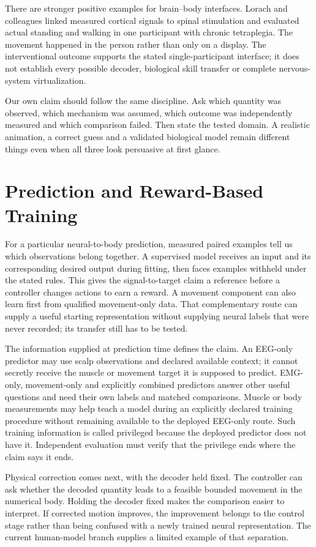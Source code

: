 There are stronger positive examples for brain--body interfaces. Lorach and
colleagues linked measured cortical signals to spinal stimulation and evaluated
actual standing and walking in one participant with chronic tetraplegia. The
movement happened in the person rather than only on a display.\cite{lorach2023}
The interventional outcome supports the stated single-participant interface;
it does not establish every possible decoder, biological skill transfer or
complete nervous-system virtualization.

Our own claim should follow the same discipline. Ask which quantity was observed,
which mechanism was assumed, which outcome was independently measured and which
comparison failed. Then state the tested domain. A realistic animation, a
correct guess and a validated biological model remain different things even
when all three look persuasive at first glance.


\section{Prediction and Reward-Based Training}

For a particular neural-to-body prediction, measured paired examples tell us which observations belong together. A supervised model receives an input and its corresponding desired output during fitting, then faces examples withheld under the stated rules. This gives the signal-to-target claim a reference before a controller changes actions to earn a reward. A movement component can also learn first from qualified movement-only data. That complementary route can supply a useful starting representation without supplying neural labels that were never recorded; its transfer still has to be tested.

The information supplied at prediction time defines the claim. An EEG-only
predictor may use scalp observations and declared available context; it cannot
secretly receive the muscle or movement target it is supposed to predict.
EMG-only, movement-only and explicitly combined predictors answer other useful
questions and need their own labels and matched comparisons. Muscle or body
measurements may help teach a model during an explicitly declared training
procedure without remaining available to the deployed EEG-only route. Such
training information is called privileged because the deployed predictor does
not have it. Independent evaluation must verify that the privilege ends where
the claim says it ends.

Physical correction comes next, with the decoder held fixed. The controller can ask whether the decoded quantity leads to a feasible bounded movement in the numerical body. Holding the decoder fixed makes the comparison easier to interpret. If corrected motion improves, the improvement belongs to the control stage rather than being confused with a newly trained neural representation. The current human-model branch supplies a limited example of that separation.

